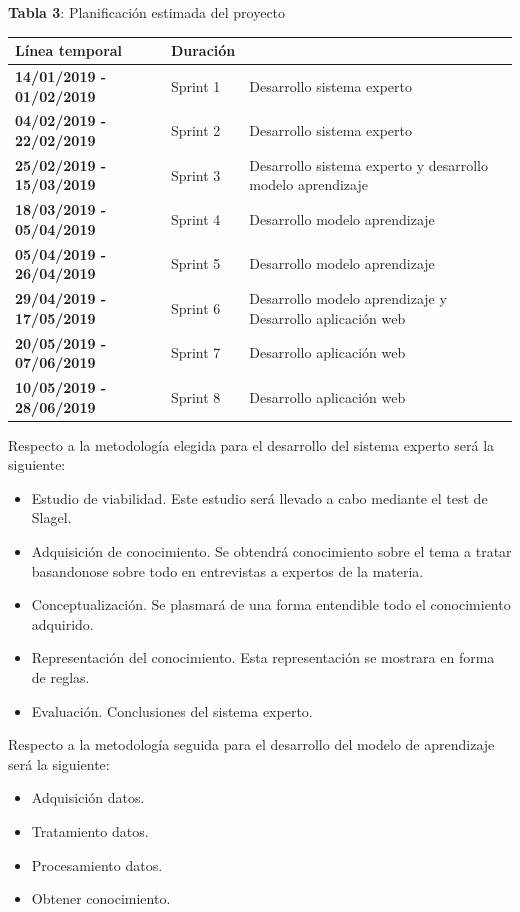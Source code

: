 \documentclass[11pt,a4paper,twoside,final]{article}
\begin{document}
\begin{center}
   \textbf{Tabla 3}: Planificación estimada del proyecto\\[1em]
   \begin{tabular}{p{} p{} p{}}
        \hline
		\textbf{Línea temporal} & \textbf{Duración}  & \text{Temática}\\
		\hline
		    \textbf{14/01/2019 - 01/02/2019} & Sprint 1 & Desarrollo sistema experto\\
		    \textbf{04/02/2019 - 22/02/2019} & Sprint 2 & Desarrollo sistema experto \\
		    \textbf{25/02/2019 - 15/03/2019} & Sprint 3 & Desarrollo sistema experto y desarrollo modelo aprendizaje\\
		    \textbf{18/03/2019 - 05/04/2019} & Sprint 4 & Desarrollo modelo aprendizaje\\
		    \textbf{05/04/2019 - 26/04/2019} & Sprint 5 & Desarrollo modelo aprendizaje\\
		    \textbf{29/04/2019 - 17/05/2019} & Sprint 6 & Desarrollo modelo aprendizaje y Desarrollo aplicación web\\
		    \textbf{20/05/2019 - 07/06/2019} & Sprint 7 & Desarrollo aplicación web\\
		    \textbf{10/05/2019 - 28/06/2019} & Sprint 8 & Desarrollo aplicación web\\
		\hline
   \end{tabular}
\end{center}


Respecto a la metodología elegida para el desarrollo del sistema experto será la siguiente:
\begin{itemize}
  \setlength\itemsep{1pt}
  \item Estudio de viabilidad. Este estudio será llevado a cabo mediante el test de Slagel.
  \item Adquisición de conocimiento. Se obtendrá conocimiento sobre el tema a tratar basandonose sobre todo en entrevistas a expertos de la materia.
  \item Conceptualización. Se plasmará de una forma entendible todo el conocimiento adquirido.
  \item Representación del conocimiento. Esta representación se mostrara en forma de reglas.
  \item Evaluación. Conclusiones del sistema experto.
\end{itemize}

Respecto a la metodología seguida para el desarrollo del modelo de aprendizaje será la siguiente:
\begin{itemize}
  \setlength\itemsep{1pt}
  \item Adquisición datos.
  \item Tratamiento datos.
  \item Procesamiento datos.
  \item Obtener conocimiento.
\end{itemize}
\end{document}
